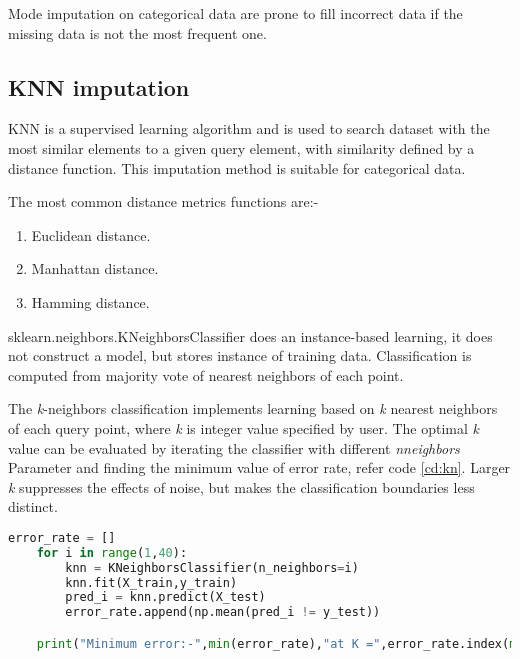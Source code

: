 Mode imputation on categorical data are prone to fill incorrect data if the missing data is not the most frequent one.


\clearpage
\subsection{\acf{KNN}  imputation}

\acl{KNN} is a supervised learning algorithm and is used to search dataset with the most similar elements to a given query element, with similarity defined by a distance function. This imputation method is suitable for categorical data.

The most common distance metrics functions are:-

\begin{enumerate}
    \item Euclidean distance.
    \item Manhattan distance.
    \item Hamming distance.
\end{enumerate}

sklearn.neighbors.KNeighborsClassifier \parencite{scikit-learn} does an instance-based learning, it does not construct a model, but stores instance of training data. Classification is computed from majority vote of nearest neighbors of each point.

The \textit{k}-neighbors classification implements learning based on  \textit{k} nearest neighbors of each query point, where \textit{k} is integer value specified by user. The optimal \textit{k} value can be evaluated by iterating the classifier with different  \textit{n\textunderscore neighbors} Parameter and finding the minimum value of error rate, refer code \ref{cd:kn}. Larger \textit{k} suppresses the effects of noise, but makes the classification boundaries less distinct.

\begin{lstlisting}[language=Python, caption={Find optimal \textit{k} value in \acl{KNN} },label={cd:kn}]
    error_rate = []
    for i in range(1,40):
        knn = KNeighborsClassifier(n_neighbors=i)
        knn.fit(X_train,y_train)
        pred_i = knn.predict(X_test)
        error_rate.append(np.mean(pred_i != y_test))

    print("Minimum error:-",min(error_rate),"at K =",error_rate.index(min(error_rate)))
\end{lstlisting}



